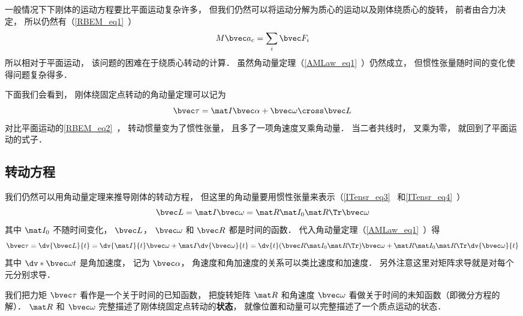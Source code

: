 

一般情况下下刚体的运动方程要比平面运动复杂许多， 但我们仍然可以将运动分解为质心的运动以及刚体绕质心的旋转， 前者由合力决定， 所以仍然有（\autoref{RBEM_eq1}~）
\begin{equation}\label{RBEqM_eq8}
M\bvec a_c = \sum_i \bvec F_i
\end{equation}
所以相对于平面运动， 该问题的困难在于绕质心转动的计算． 虽然角动量定理（\autoref{AMLaw_eq1}~）仍然成立， 但惯性张量随时间的变化使得问题复杂得多．

下面我们会看到， 刚体绕固定点转动的角动量定理可以记为
\begin{equation}
\bvec\tau = \mat I \bvec\alpha + \bvec\omega \cross \bvec L
\end{equation}
对比平面运动的\autoref{RBEM_eq2}~， 转动惯量变为了惯性张量， 且多了一项角速度叉乘角动量． 当二者共线时， 叉乘为零， 就回到了平面运动的式子．

\subsection{转动方程}
我们仍然可以用角动量定理来推导刚体的转动方程， 但这里的角动量要用惯性张量来表示（\autoref{ITensr_eq3}~ 和\autoref{ITensr_eq4}~）
\begin{equation}
\bvec L = \mat I \bvec \omega = \mat R \mat I_0 \mat R\Tr \bvec \omega
\end{equation}
其中 $\mat I_0$ 不随时间变化， $\bvec L$， $\bvec \omega$ 和 $\bvec R$ 都是时间的函数． 代入角动量定理（\autoref{AMLaw_eq1}~）得
\begin{equation}\label{RBEqM_eq3}
\bvec \tau = \dv{\bvec L}{t} = \dv{\mat I}{t} \bvec\omega + \mat I \dv{\bvec\omega}{t}
= \dv{t} (\bvec R\mat I_0 \mat R\Tr) \bvec \omega + \mat R \mat I_0 \mat R\Tr \dv{\bvec \omega}{t}
\end{equation}
其中 $\dv*{\bvec\omega}{t}$ 是角加速度， 记为 $\bvec\alpha$， 角速度和角加速度的关系可以类比速度和加速度． 另外注意这里对矩阵求导就是对每个元分别求导．

我们把力矩 $\bvec \tau$ 看作是一个关于时间的已知函数， 把旋转矩阵 $\mat R$ 和角速度 $\bvec \omega$ 看做关于时间的未知函数（即微分方程的解）． $\mat R$ 和 $\bvec \omega$ 完整描述了刚体绕固定点转动的\textbf{状态}， 就像位置和动量可以完整描述了一个质点运动的状态．

